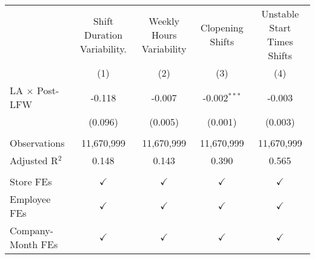 
\begingroup
\centering
\scriptsize
\begin{tabular}{lcccc}
   \toprule
                         & Shift Duration Variability. & Weekly Hours Variability & Clopening Shifts      &  Unstable Start Times Shifts\\   
                         & (1)            & (2)             & (3)            & (4)\\  
   \midrule 
   LA $\times$ Post-LFW  & -0.118         & -0.007          & -0.002$^{***}$ & -0.003\\   
                         & (0.096)        & (0.005)         & (0.001)        & (0.003)\\   
    \\
   Observations          & 11,670,999     & 11,670,999      & 11,670,999     & 11,670,999\\  
   Adjusted R$^2$        & 0.148          & 0.143           & 0.390          & 0.565\\  
    \\
   Store FEs             & $\checkmark$   & $\checkmark$    & $\checkmark$   & $\checkmark$\\   
   Employee FEs          & $\checkmark$   & $\checkmark$    & $\checkmark$   & $\checkmark$\\   
   Company-Month FEs     & $\checkmark$   & $\checkmark$    & $\checkmark$   & $\checkmark$\\   
   \bottomrule
\end{tabular}
\par\endgroup


